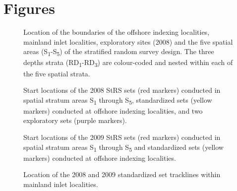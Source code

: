 \documentclass[12pt]{article}\usepackage[]{graphicx}\usepackage[]{color}
\begin{document}
\hypertarget{figures}{%
\section{Figures}\label{figures}}


\begin{figure}[htb]

{\centering {} 

}

\caption{Location of the boundaries of the offshore indexing localities, mainland inlet localities, exploratory sites (2008) and the five spatial areas (S\textsubscript{1}-S\textsubscript{5}) of the stratified random survey design. The three depths strata (RD\textsubscript{1}-RD\textsubscript{3}) are colour-coded and nested within each of the five spatial strata.}\label{fig:figure1}
\end{figure}
\clearpage


\begin{figure}[htb]

{\centering {} 

}

\caption{Start locations of the 2008 StRS sets (red markers) conducted in spatial stratum areas S\textsubscript{1} through S\textsubscript{5}, standardized sets (yellow markers) conducted at offshore indexing localities, and two exploratory sets (purple markers).}\label{fig:figure2}
\end{figure}
\clearpage


\begin{figure}[htb]

{\centering {} 

}

\caption{Start locations of the 2009 StRS sets (red markers) conducted in spatial stratum areas S\textsubscript{1} through S\textsubscript{5} and standardized sets (yellow markers) conducted at offshore indexing localities.}\label{fig:figure3}
\end{figure}
\clearpage


\begin{figure}[htb]

{\centering {} 

}

\caption{Location of the 2008 and 2009 standardized set tracklines within mainland inlet localities.\\}\label{fig:figure4}
\end{figure}
\clearpage
\end{document}
